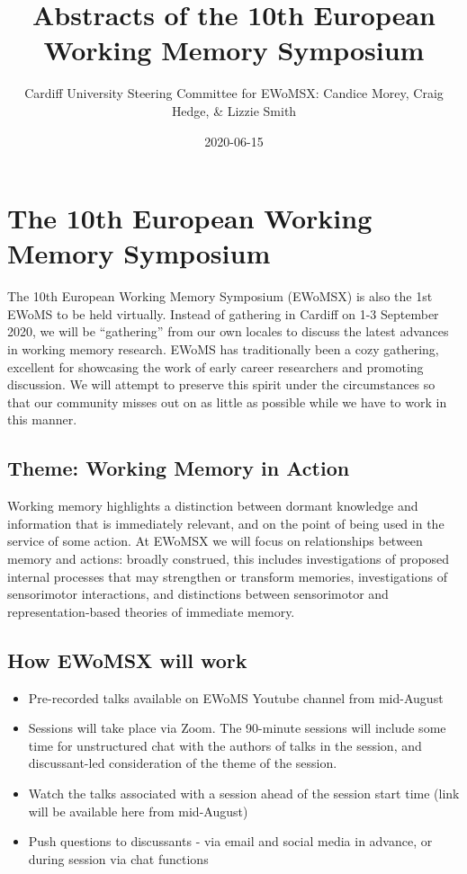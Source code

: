 \documentclass[
  12pt,
]{book}
\title{Abstracts of the 10th European Working Memory Symposium}
\author{Cardiff University Steering Committee for EWoMSX: Candice Morey, Craig Hedge, \& Lizzie Smith}
\date{2020-06-15}
\begin{document}
\maketitle

{
\setcounter{tocdepth}{1}
\tableofcontents
}
\hypertarget{the-10th-european-working-memory-symposium}{%
\chapter{The 10th European Working Memory Symposium}\label{the-10th-european-working-memory-symposium}}

The 10th European Working Memory Symposium (EWoMSX) is also the 1st EWoMS to be held virtually. Instead of gathering in Cardiff on 1-3 September 2020, we will be ``gathering'' from our own locales to discuss the latest advances in working memory research. EWoMS has traditionally been a cozy gathering, excellent for showcasing the work of early career researchers and promoting discussion. We will attempt to preserve this spirit under the circumstances so that our community misses out on as little as possible while we have to work in this manner.

\hypertarget{theme-working-memory-in-action}{%
\section{Theme: Working Memory in Action}\label{theme-working-memory-in-action}}

Working memory highlights a distinction between dormant knowledge and information that is immediately relevant, and on the point of being used in the service of some action. At EWoMSX we will focus on relationships between memory and actions: broadly construed, this includes investigations of proposed internal processes that may strengthen or transform memories, investigations of sensorimotor interactions, and distinctions between sensorimotor and representation-based theories of immediate memory.

\hypertarget{how-ewomsx-will-work}{%
\section{How EWoMSX will work}\label{how-ewomsx-will-work}}

\begin{itemize}
\item
  Pre-recorded talks available on EWoMS Youtube channel from mid-August
\item
  Sessions will take place via Zoom. The 90-minute sessions will include some time for unstructured chat with the authors of talks in the session, and discussant-led consideration of the theme of the session.
\item
  Watch the talks associated with a session ahead of the session start time (link will be available here from mid-August)
\item
  Push questions to discussants - via email and social media in advance, or during session via chat functions
\end{itemize}
\end{document}
